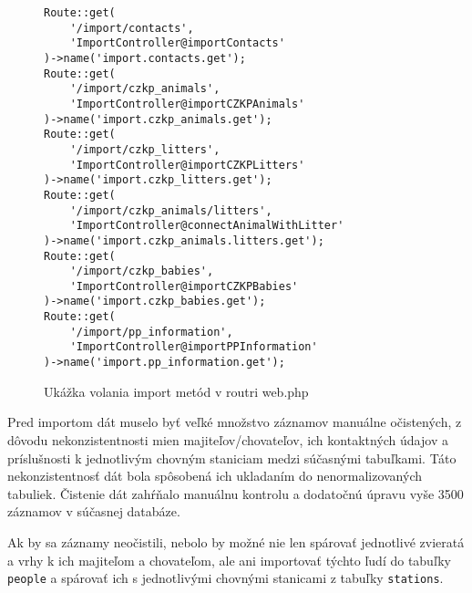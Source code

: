 \begin{figure}[H]
\begin{verbatim}
Route::get(
    '/import/contacts',
    'ImportController@importContacts'
)->name('import.contacts.get');
Route::get(
    '/import/czkp_animals',
    'ImportController@importCZKPAnimals'
)->name('import.czkp_animals.get');
Route::get(
    '/import/czkp_litters',
    'ImportController@importCZKPLitters'
)->name('import.czkp_litters.get');
Route::get(
    '/import/czkp_animals/litters',
    'ImportController@connectAnimalWithLitter'
)->name('import.czkp_animals.litters.get');
Route::get(
    '/import/czkp_babies',
    'ImportController@importCZKPBabies'
)->name('import.czkp_babies.get');
Route::get(
    '/import/pp_information',
    'ImportController@importPPInformation'
)->name('import.pp_information.get');
\end{verbatim}
\caption[Ukážka volania import metód v routri web.php]
{Ukážka volania import metód v routri web.php}
\label{router-import-code}
\end{figure}

Pred importom dát muselo byť veľké množstvo záznamov manuálne očistených, z dôvodu nekonzistentnosti mien majiteľov/chovateľov, ich kontaktných údajov a príslušnosti k jednotlivým chovným staniciam medzi súčasnými tabuľkami. Táto nekonzistentnosť dát bola spôsobená ich ukladaním do nenormalizovaných tabuliek. Čistenie dát zahŕňalo manuálnu kontrolu a dodatočnú úpravu vyše 3500 záznamov v súčasnej databáze.

Ak by sa záznamy neočistili, nebolo by možné nie len spárovať jednotlivé zvieratá a vrhy k ich majiteľom a chovateľom, ale ani importovať týchto ľudí do tabuľky \texttt{people} a spárovať ich s jednotlivými chovnými stanicami z tabuľky \texttt{stations}.
